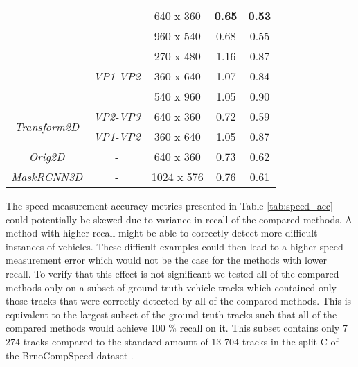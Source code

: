 \documentclass[twocolumn]{svjour3}          \smartqed  \usepackage{graphicx}
\begin{document}
\begin{table}[]
{\begin{tabular}{|c|c|c|c|c|}
                                        &                                   & 640 x 360                   & \textbf{0.65}  & \textbf{0.53}  \\ \cline{3-5} 
                                        &                                   & 960 x 540                   & 0.68  & 0.55  \\ \cline{2-5} 
                                        & \multirow{3}{*}{\textit{VP1-VP2}} & 270 x 480                   & 1.16  & 0.87  \\ \cline{3-5} 
                                        &                                   & 360 x 640                   & 1.07  & 0.84  \\ \cline{3-5} 
                                        &                                   & 540 x 960                   & 1.05  & 0.90  \\ \hline
\multirow{2}{*}{\textit{Transform2D}}   & \textit{VP2-VP3}                  & 640 x 360                   & 0.72  & 0.59  \\ \cline{2-5} 
                                        & \textit{VP1-VP2}                  & 360 x 640                   & 1.05  & 0.87  \\ \hline
\textit{Orig2D}                         & -                                 & 640 x 360                   & 0.73  & 0.62  \\ \hline
\textit{MaskRCNN3D}                     & -                                 & 1024 x 576                  & 0.76  & 0.61  \\ \hline
\end{tabular}}
\end{table}

The speed measurement accuracy metrics presented in Table \ref{tab:speed_acc} could potentially be skewed due to variance in recall of the compared methods. A method with higher recall might be able to correctly detect more difficult instances of vehicles. These difficult examples could then lead to a higher speed measurement error which would not be the case for the methods with lower recall. To verify that this effect is not significant we tested all of the compared methods only on a subset of ground truth vehicle tracks which contained only those tracks that were correctly detected by all of the compared methods. This is equivalent to the largest subset of the ground truth tracks such that all of the compared methods would achieve 100 \% recall on it. This subset contains only 7 274 tracks compared to the standard amount of 13 704 tracks in the split C of the BrnoCompSpeed dataset \cite{brnocompspeed}.
\end{document}
